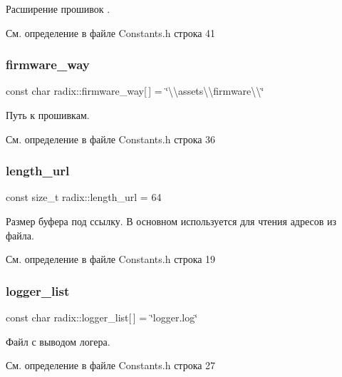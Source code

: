 Расширение прошивок . 

См. определение в файле Constants.\+h строка 41

\mbox{\label{namespaceradix_a123392a7ece6e11efaf3ad3df291ff3d}} 
\subsubsection{\texorpdfstring{firmware\+\_\+way}{firmware\_way}}
{\footnotesize\ttfamily const char radix\+::firmware\+\_\+way\mbox{[}$\,$\mbox{]} = \char`\"{}\textbackslash{}\textbackslash{}assets\textbackslash{}\textbackslash{}firmware\textbackslash{}\textbackslash{}\char`\"{}}

Путь к прошивкам. 

См. определение в файле Constants.\+h строка 36

\mbox{\label{namespaceradix_a21a5c4cd2370c706df61763c0069475a}} 
\subsubsection{\texorpdfstring{length\+\_\+url}{length\_url}}
{\footnotesize\ttfamily const size\+\_\+t radix\+::length\+\_\+url = 64}

Размер буфера под ссылку. В основном используется для чтения адресов из файла. 

См. определение в файле Constants.\+h строка 19

\mbox{\label{namespaceradix_a11c5bfe5c65a0f88a2a950111c6ffc09}} 
\subsubsection{\texorpdfstring{logger\+\_\+list}{logger\_list}}
{\footnotesize\ttfamily const char radix\+::logger\+\_\+list\mbox{[}$\,$\mbox{]} = \char`\"{}logger.\+log\char`\"{}}

Файл с выводом логера. 

См. определение в файле Constants.\+h строка 27

\mbox{\label{namespaceradix_aa90f63f1d0143b58469670ccbb86cfc4}} 
